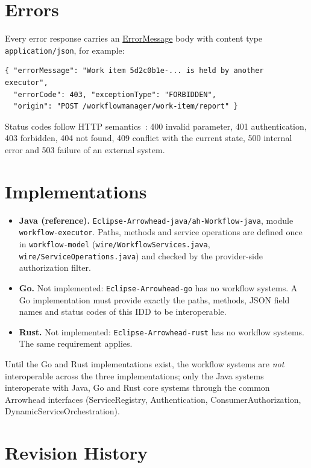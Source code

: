 \documentclass[a4paper]{arrowhead}
\newcommand{\mref}[1]{{\textcolor{ArrowheadPurple}{\hyperref[sec:model:#1]{#1}}}}
\begin{document}
\section{Errors}
\label{sec:errors}
Every error response carries an \mref{ErrorMessage} body with content type \texttt{application/json}, for example:
\begin{lstlisting}
{ "errorMessage": "Work item 5d2c0b1e-... is held by another executor",
  "errorCode": 403, "exceptionType": "FORBIDDEN",
  "origin": "POST /workflowmanager/work-item/report" }
\end{lstlisting}
Status codes follow HTTP semantics~\cite{rfc9110}: 400 invalid parameter, 401 authentication, 403 forbidden, 404 not
found, 409 conflict with the current state, 500 internal error and 503 failure of an external system.


\section{Implementations}
\label{sec:implementations}
\begin{itemize}
\item \textbf{Java (reference).} \texttt{Eclipse-Arrowhead-java/ah-Workflow-java}, module \texttt{workflow-executor}. Paths, methods and service
operations are defined once in \texttt{workflow-model} (\texttt{wire/WorkflowServices.java}, \texttt{wire/ServiceOperations.java}) and checked by the provider-side authorization filter.
\item \textbf{Go.} Not implemented: \texttt{Eclipse-Arrowhead-go} has no workflow systems. A Go implementation must
provide exactly the paths, methods, JSON field names and status codes of this IDD to be interoperable.
\item \textbf{Rust.} Not implemented: \texttt{Eclipse-Arrowhead-rust} has no workflow systems. The same requirement applies.
\end{itemize}
Until the Go and Rust implementations exist, the workflow systems are \emph{not} interoperable across the three
implementations; only the Java systems interoperate with Java, Go and Rust core systems through the common Arrowhead
interfaces (ServiceRegistry, Authentication, ConsumerAuthorization, DynamicServiceOrchestration).


\newpage



\newpage

\section{Revision History}
\end{document}
